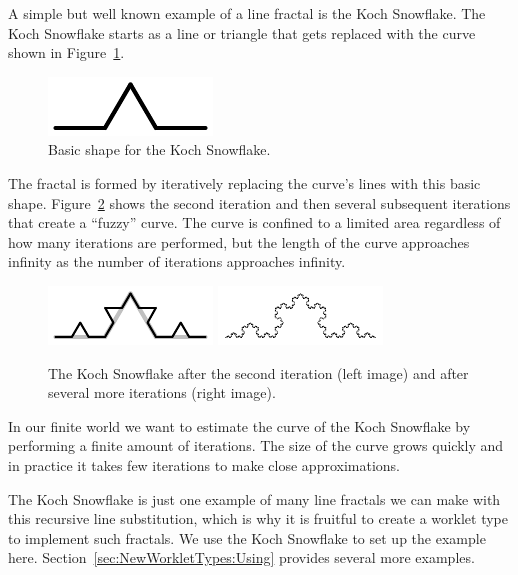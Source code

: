 A simple but well known example of a line fractal is the  Koch Snowflake.
The Koch Snowflake starts as a line or triangle that gets replaced with the curve shown in Figure~\ref{fig:KochShape}.

\begin{figure}[htb]
  \centering
  \includegraphics[scale=2]{images/Koch1.pdf}
  \caption{Basic shape for the Koch Snowflake.}
  \label{fig:KochShape}
\end{figure}

The fractal is formed by iteratively replacing the curve's lines with this basic shape.
Figure~\ref{fig:KochIterations} shows the second iteration and then several subsequent iterations that create a ``fuzzy'' curve.
The curve is confined to a limited area regardless of how many iterations are performed, but the length of the curve approaches infinity as the number of iterations approaches infinity.

\begin{figure}[htb]
  \centering
  \includegraphics[scale=2]{images/Koch2.pdf}
  \includegraphics[scale=2]{images/Koch5.pdf}
  \caption[The Koch Snowflake after multiple iterations.]{
    The Koch Snowflake after the second iteration (left image) and after several more iterations (right image).
  }
  \label{fig:KochIterations}
\end{figure}

In our finite world we want to estimate the curve of the Koch Snowflake by performing a finite amount of iterations.
The size of the curve grows quickly and in practice it takes few iterations to make close approximations.

\begin{didyouknow}
  The Koch Snowflake is just one example of many line fractals we can make with this recursive line substitution, which is why it is fruitful to create a worklet type to implement such fractals.
  We use the Koch Snowflake to set up the example here.
  Section~\ref{sec:NewWorkletTypes:Using} provides several more examples.
\end{didyouknow}

